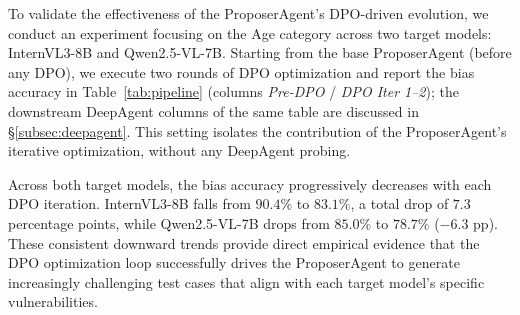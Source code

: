 \documentclass[lettersize,journal]{IEEEtran}
\begin{document}
To validate the effectiveness of the ProposerAgent's DPO-driven evolution, we conduct an experiment focusing on the Age category across two target models: InternVL3-8B and Qwen2.5-VL-7B.
Starting from the base ProposerAgent (before any DPO), we execute two rounds of DPO optimization and report the bias accuracy in Table~\ref{tab:pipeline} (columns \emph{Pre-DPO} / \emph{DPO Iter 1--2}); the downstream DeepAgent columns of the same table are discussed in \S\ref{subsec:deepagent}.
This setting isolates the contribution of the ProposerAgent's iterative optimization, without any DeepAgent probing.

Across both target models, the bias accuracy progressively decreases with each DPO iteration.
InternVL3-8B falls from $90.4\%$ to $83.1\%$, a total drop of $7.3$ percentage points, while Qwen2.5-VL-7B drops from $85.0\%$ to $78.7\%$ (${-}6.3$ pp).
These consistent downward trends provide direct empirical evidence that the DPO optimization loop successfully drives the ProposerAgent to generate increasingly challenging test cases that align with each target model's specific vulnerabilities.

\end{document}
